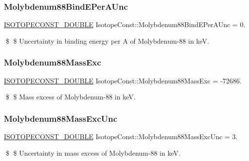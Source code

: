 \subsubsection{\texorpdfstring{Molybdenum88\+Bind\+E\+Per\+A\+Unc}{Molybdenum88BindEPerAUnc}}
{\footnotesize\ttfamily \mbox{\hyperlink{group___isotope_const-_macros_ga8f45a7272ce02c0b4c65c44636ed719a}{I\+S\+O\+T\+O\+P\+E\+C\+O\+N\+S\+T\+\_\+\+D\+O\+U\+B\+LE}} Isotope\+Const\+::\+Molybdenum88\+Bind\+E\+Per\+A\+Unc = 0.}

\$ \$ Uncertainty in binding energy per A of Molybdenum-\/88 in keV. \mbox{\label{group___isotope_const-_molybdenum-_mo88_ga45735d259c779d82e5d1526d39fac40e}} 
\subsubsection{\texorpdfstring{Molybdenum88\+Mass\+Exc}{Molybdenum88MassExc}}
{\footnotesize\ttfamily \mbox{\hyperlink{group___isotope_const-_macros_ga8f45a7272ce02c0b4c65c44636ed719a}{I\+S\+O\+T\+O\+P\+E\+C\+O\+N\+S\+T\+\_\+\+D\+O\+U\+B\+LE}} Isotope\+Const\+::\+Molybdenum88\+Mass\+Exc = -\/72686.}

\$ \$ Mass excess of Molybdenum-\/88 in keV. \mbox{\label{group___isotope_const-_molybdenum-_mo88_gaea113ef4dcfb621504161639225e0d8e}} 
\subsubsection{\texorpdfstring{Molybdenum88\+Mass\+Exc\+Unc}{Molybdenum88MassExcUnc}}
{\footnotesize\ttfamily \mbox{\hyperlink{group___isotope_const-_macros_ga8f45a7272ce02c0b4c65c44636ed719a}{I\+S\+O\+T\+O\+P\+E\+C\+O\+N\+S\+T\+\_\+\+D\+O\+U\+B\+LE}} Isotope\+Const\+::\+Molybdenum88\+Mass\+Exc\+Unc = 3.}

\$ \$ Uncertainty in mass excess of Molybdenum-\/88 in keV. \mbox{\label{group___isotope_const-_molybdenum-_mo88_gad82dcbb17ee2e55c04152fe41c59393e}} 
